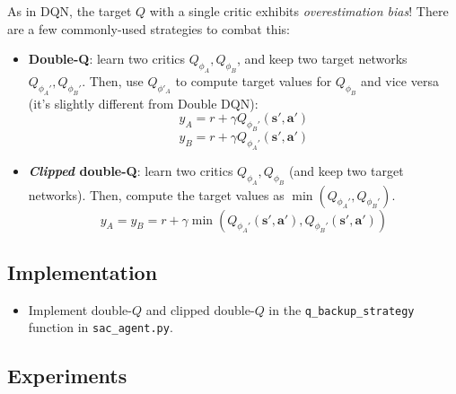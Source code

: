 \documentclass{article}
\def\rva{{\mathbf{a}}}
\def\rvs{{\mathbf{s}}}
\begin{document}
As in DQN, the target $Q$ with a single critic exhibits \textit{overestimation bias}! There are a few commonly-used strategies to combat this:
\begin{itemize}
    \item \textbf{Double-Q}: learn two critics $Q_{\phi_A}, Q_{\phi_B}$, and keep two target networks $Q_{\phi_A'}, Q_{\phi_B'}$. Then, use $Q_{\phi'_A}$ to compute target values for $Q_{\phi_B}$ and vice versa (it's slightly different from Double DQN):
    \[y_A = r + \gamma Q_{\phi_B'}(\rvs', \rva')\]
    \[y_B = r + \gamma Q_{\phi_A'}(\rvs', \rva')\]
    
    \item \textbf{\textit{Clipped} double-Q}: learn two critics $Q_{\phi_A}, Q_{\phi_B}$ (and keep two target networks). Then, compute the target values as $\min(Q_{\phi_A'}, Q_{\phi_B'})$.
    \[y_A = y_B = r + \gamma \min\left(Q_{\phi_A'}(\rvs', \rva'), Q_{\phi_B'}(\rvs', \rva')\right)\]
\end{itemize}


\subsection{Implementation}

\begin{itemize}
    \item Implement double-$Q$ and clipped double-$Q$ in the \verb|q_backup_strategy| function in \verb|sac_agent.py|.
\end{itemize}


\subsection{Experiments}
\end{document}
